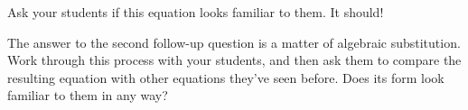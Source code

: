 
Ask your students if this equation looks familiar to them.  It should!

\vskip 10pt

The answer to the second follow-up question is a matter of algebraic substitution.  Work through this process with your students, and then ask them to compare the resulting equation with other equations they've seen before.  Does its form look familiar to them in any way?




